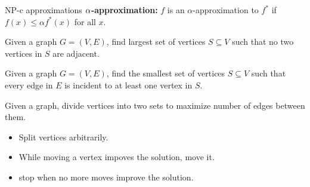 \documentclass[10pt,a4paper]{article}
\begin{document}
\begin{multicols}{3}
\begin{textbox}{NP-c approximations}
    {\bf ${\bf \alpha}$-approximation:} $f$ is an $\alpha$-approximation to 
    $f^*$ if $f(x) \leq \alpha f^*(x)$ for all $x$.

     Given a graph $G = (V, E)$, find largest set of 
    vertices $S \subseteq V$ such that no two vertices in $S$ are adjacent.

     Given a graph $G = (V, E)$, find the smallest set of 
    vertices $S \subseteq V$ such that every edge in $E$ is incident to at 
    least one vertex in $S$.

     Given a graph, divide vertices into two sets to maximize 
    number of edges between them.
    \begin{itemize}
        \item Split vertices arbitrarily. 
        \item While moving a vertex impoves the solution, move it.
        \item stop when no more moves improve the solution.
    \end{itemize}

\end{textbox}

\end{multicols}
\end{document}
